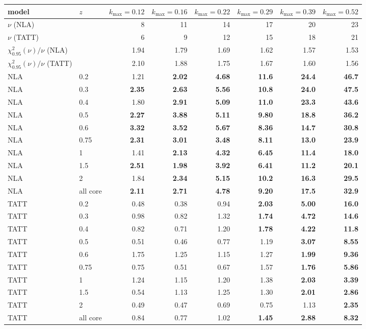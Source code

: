 \begin{tabular}{llrrrrrr}\toprule
model & $z$ & $k_{\max}=0.12$ & $k_{\max}=0.16$ & $k_{\max}=0.22$ & $k_{\max}=0.29$ & $k_{\max}=0.39$ & $k_{\max}=0.52$\\\midrule
$\nu$ (NLA) &  & 8 & 11 & 14 & 17 & 20 & 23\\
$\nu$ (TATT) &  & 6 & 9 & 12 & 15 & 18 & 21\\
$\chi^2_{0.95}(\nu)/\nu$ (NLA) &  & 1.94 & 1.79 & 1.69 & 1.62 & 1.57 & 1.53\\
$\chi^2_{0.95}(\nu)/\nu$ (TATT) &  & 2.10 & 1.88 & 1.75 & 1.67 & 1.60 & 1.56\\
\midrule
NLA & 0.2 & 1.21 & \textbf{2.02} & \textbf{4.68} & \textbf{11.6} & \textbf{24.4} & \textbf{46.7}\\
NLA & 0.3 & \textbf{2.35} & \textbf{2.63} & \textbf{5.56} & \textbf{10.8} & \textbf{24.0} & \textbf{47.5}\\
NLA & 0.4 & 1.80 & \textbf{2.91} & \textbf{5.09} & \textbf{11.0} & \textbf{23.3} & \textbf{43.6}\\
NLA & 0.5 & \textbf{2.27} & \textbf{3.88} & \textbf{5.11} & \textbf{9.80} & \textbf{18.8} & \textbf{36.2}\\
NLA & 0.6 & \textbf{3.32} & \textbf{3.52} & \textbf{5.67} & \textbf{8.36} & \textbf{14.7} & \textbf{30.8}\\
NLA & 0.75 & \textbf{2.31} & \textbf{3.01} & \textbf{3.48} & \textbf{8.11} & \textbf{13.0} & \textbf{23.9}\\
NLA & 1 & 1.41 & \textbf{2.13} & \textbf{4.32} & \textbf{6.45} & \textbf{11.4} & \textbf{18.0}\\
NLA & 1.5 & \textbf{2.51} & \textbf{1.98} & \textbf{3.92} & \textbf{6.41} & \textbf{11.2} & \textbf{20.1}\\
NLA & 2 & 1.84 & \textbf{2.34} & \textbf{5.15} & \textbf{10.2} & \textbf{16.3} & \textbf{29.5}\\
NLA & all core & \textbf{2.11} & \textbf{2.71} & \textbf{4.78} & \textbf{9.20} & \textbf{17.5} & \textbf{32.9}\\
\midrule
TATT & 0.2 & 0.48 & 0.38 & 0.94 & \textbf{2.03} & \textbf{5.00} & \textbf{16.0}\\
TATT & 0.3 & 0.98 & 0.82 & 1.32 & \textbf{1.74} & \textbf{4.72} & \textbf{14.6}\\
TATT & 0.4 & 0.82 & 0.71 & 1.20 & \textbf{1.78} & \textbf{4.22} & \textbf{11.8}\\
TATT & 0.5 & 0.51 & 0.46 & 0.77 & 1.19 & \textbf{3.07} & \textbf{8.55}\\
TATT & 0.6 & 1.75 & 1.25 & 1.15 & 1.27 & \textbf{1.99} & \textbf{9.36}\\
TATT & 0.75 & 0.75 & 0.51 & 0.67 & 1.57 & \textbf{1.76} & \textbf{5.86}\\
TATT & 1 & 1.24 & 1.15 & 1.20 & 1.38 & \textbf{2.03} & \textbf{3.39}\\
TATT & 1.5 & 0.54 & 1.13 & 1.25 & 1.30 & \textbf{2.01} & \textbf{2.86}\\
TATT & 2 & 0.49 & 0.47 & 0.69 & 0.75 & 1.13 & \textbf{2.35}\\
TATT & all core & 0.84 & 0.77 & 1.02 & \textbf{1.45} & \textbf{2.88} & \textbf{8.32}\\
\bottomrule\end{tabular}